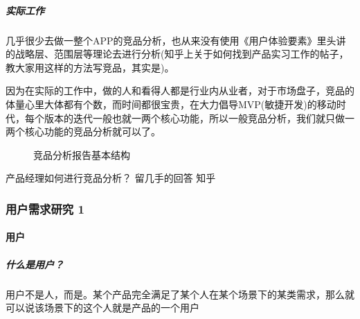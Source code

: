 \documentclass[letterpaper,10pt,english]{sphinxmanual}
\begin{document}
\subparagraph{实际工作}
\label{\detokenize{chapter_knowledge/goods_analysis:id31}}
几乎很少去做一整个APP的竞品分析，也从来没有使用《用户体验要素》里头讲的战略层、范围层等理论去进行分析(知乎上关于如何找到产品实习工作的帖子，教大家用这样的方法写竞品，其实是)。

因为在实际的工作中，做的人和看得人都是行业内从业者，对于市场盘子，竞品的体量心里大体都有个数，而时间都很宝贵，在大力倡导MVP(敏捷开发)的移动时代，每个版本的迭代一般也就一两个核心功能，所以一般竞品分析，我们就只做一两个核心功能的竞品分析就可以了。%
\begin{footnote}[535]\sphinxAtStartFootnote
{}
%
\end{footnote}

\begin{figure}[H]
\centering
\capstart

\noindent{}
\caption{竞品分析报告基本结构}\label{\detokenize{chapter_knowledge/goods_analysis:id35}}\end{figure}

产品经理如何进行竞品分析？ \sphinxhyphen{} 留几手的回答 \sphinxhyphen{} 知乎


\subsubsection{用户需求研究 1\sphinxfootnotemark[536]}
\label{\detokenize{chapter_knowledge/users_analysis:users-analysis}}\label{\detokenize{chapter_knowledge/users_analysis:id1}}\label{\detokenize{chapter_knowledge/users_analysis::doc}}%
\begin{footnotetext}[536]\sphinxAtStartFootnote
{}
%
\end{footnotetext}\ignorespaces 

\paragraph{用户}
\label{\detokenize{chapter_knowledge/users_analysis:id2}}

\subparagraph{什么是用户？}
\label{\detokenize{chapter_knowledge/users_analysis:id3}}
用户不是人，而是。某个产品完全满足了某个人在某个场景下的某类需求，那么就可以说该场景下的这个人就是产品的一个用户
\end{document}

